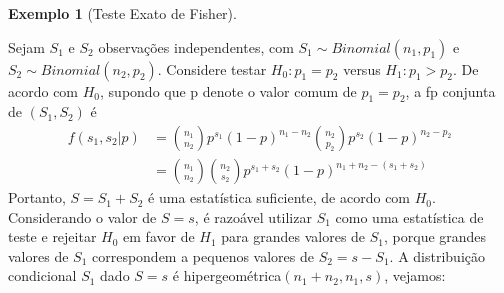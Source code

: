 \documentclass[10pt]{article}
\theoremstyle{plain}
\theoremstyle{remark}
\theoremstyle{definition}
\newtheorem{exe}[teor]{Exemplo}
\begin{document}
\begin{exe}[Teste Exato de Fisher]
 \begin{framed}
 Sejam $S_{1}$ e $S_{2}$ observações independentes, com $S_{1} \sim Binomial(n_1,p_1)$ e $S_{2} \sim Binomial(n_2,p_2)$. Considere testar $H_0: p_1=p_2$ versus $H_1: p_1 > p_2$. De acordo com $H_{0}$, supondo que p denote o valor comum de $p_1=p_2$, a fp conjunta de $(S_1,S_2)$ é
\begin{align*}
    f(s_1,s_2|p)&=\binom{n_1}{n_2}p^{s_1}(1-p)^ {n_1-n_2}\binom{n_2}{p_2}p^{s_2}(1-p)^{n_2-p_2}\\
    &=\binom{n_1}{n_2}\binom{n_2}{s_2}p^{s_1+s_2}(1-p)^{n_1+n_2-(s_1+s_2)}
\end{align*}
Portanto, $S=S_1+S_2$ é uma estatística suficiente, de acordo com $H_0$. Considerando o valor de $S=s$, é razoável utilizar $S_1$ como uma estatística de teste e rejeitar $H_0$ em favor de $H_1$ para grandes valores de $S_1$, porque grandes valores de $S_1$ correspondem a pequenos valores de $S_2=s-S_1$. A distribuição condicional $S_1$ dado $S=s$ é hipergeométrica$(n_1+n_2,n_1,s)$, vejamos:


\end{framed}
\end{exe}
\end{document}

